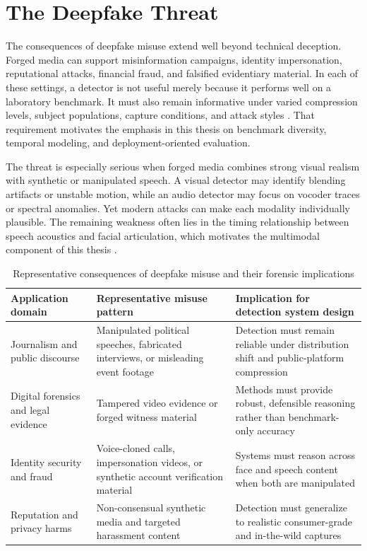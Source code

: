 \section{The Deepfake Threat}

The consequences of deepfake misuse extend well beyond technical deception. Forged media can support misinformation campaigns, identity impersonation, reputational attacks, financial fraud, and falsified evidentiary material. In each of these settings, a detector is not useful merely because it performs well on a laboratory benchmark. It must also remain informative under varied compression levels, subject populations, capture conditions, and attack styles \cite{mubarak2023survey,dissanayake2025review}. That requirement motivates the emphasis in this thesis on benchmark diversity, temporal modeling, and deployment-oriented evaluation.

The threat is especially serious when forged media combines strong visual realism with synthetic or manipulated speech. A visual detector may identify blending artifacts or unstable motion, while an audio detector may focus on vocoder traces or spectral anomalies. Yet modern attacks can make each modality individually plausible. The remaining weakness often lies in the timing relationship between speech acoustics and facial articulation, which motivates the multimodal component of this thesis \cite{Katamneni2024,Haliassos2022,parikh2023audio}.

\begin{table}[H]
\centering
\small
\caption{Representative consequences of deepfake misuse and their forensic implications}
\label{tab:intro-threats}
\begin{tabular}{p{}p{}p{}}
\toprule
\textbf{Application domain} & \textbf{Representative misuse pattern} & \textbf{Implication for detection system design} \\
\midrule
Journalism and public discourse & Manipulated political speeches, fabricated interviews, or misleading event footage & Detection must remain reliable under distribution shift and public-platform compression \\
Digital forensics and legal evidence & Tampered video evidence or forged witness material & Methods must provide robust, defensible reasoning rather than benchmark-only accuracy \\
Identity security and fraud & Voice-cloned calls, impersonation videos, or synthetic account verification material & Systems must reason across face and speech content when both are manipulated \\
Reputation and privacy harms & Non-consensual synthetic media and targeted harassment content & Detection must generalize to realistic consumer-grade and in-the-wild captures \\
\bottomrule
\end{tabular}
\end{table}

